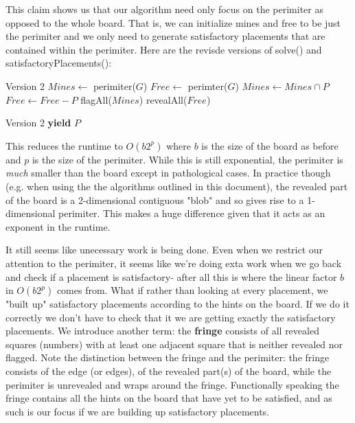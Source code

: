 \documentclass{article}
\theoremstyle{definition}
\theoremstyle{definition}
\theoremstyle{theorem}
\begin{document}
	This claim shows us that our algorithm need only focus on the perimiter as opposed to the whole board. That is, we can initialize mines and free to be just the perimiter and we only need to generate satisfactory placements that are contained within the perimiter. Here are the revisde versions of solve() and satisfactoryPlacements():
	
	\begin{algorithmic}
		 \Comment Version 2
		\State $Mines \gets$ perimiter($G$)
		\State $Free \gets$ perimter($G$)
		\State $Mines \gets Mines \cap P$
		\State $Free \gets Free -  P$
		\EndFor
		\State flagAll($Mines$)
		\State revealAll($Free$)
		\EndFunction
	\end{algorithmic}
	
	\begin{algorithmic}
		 \Comment Version 2
		\For{$P$ in $\mathcal{P}$(perimiter($G$))}
		\If{$P$ is satisfactory}
		\State \textbf{yield} $P$
		\EndIf
		\EndFor
		\EndFunction
	\end{algorithmic}
	
	This reduces the runtime to $O(b2^{p})$ where $b$ is the size of the board as before and $p$ is the size of the perimiter. While this is still exponential, the perimiter is \textit{much} smaller than the board except in pathological cases. In practice though (e.g. when using the the algorithms outlined in this document), the revealed part of the board is a 2-dimensional contiguous "blob" and so gives rise to a 1-dimensional perimiter. This makes a huge difference given that it acts as an exponent in the runtime.
	
	It still seems like unecessary work is being done. Even when we restrict our attention to the perimiter, it seems like we're doing exta work when we go back and check if a placement is satisfactory- after all this is where the linear factor $b$ in $O(b2^{p})$ comes from. What if rather than looking at every placement, we "built up" satisfactory placements according to the hints on the board. If we do it correctly we don't have to check that it we are getting exactly the satisfactory placements. We introduce another term: the \textbf{fringe} consists of all revealed squares (numbers) with at least one adjacent square that is neither revealed nor flagged. Note the distinction between the fringe and the perimiter: the fringe consists of the edge (or edges), of the revealed part(s) of the board, while the perimiter is unrevealed and wraps around the fringe. Functionally speaking the fringe contains all the hints on the board that have yet to be satisfied, and as such is our focus if we are building up satisfactory placements.
	
\end{document}
